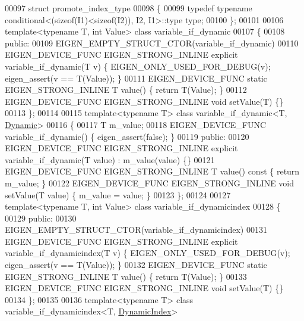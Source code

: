 \begin{DoxyCode}
00097 \textcolor{keyword}{struct }promote\_index\_type
00098 \{
00099   \textcolor{keyword}{typedef} \textcolor{keyword}{typename} conditional<(sizeof(I1)<sizeof(I2)), I2, I1>::type type;
00100 \};
00101 
00106 \textcolor{keyword}{template}<\textcolor{keyword}{typename} T, \textcolor{keywordtype}{int} Value> \textcolor{keyword}{class }variable\_if\_dynamic
00107 \{
00108   \textcolor{keyword}{public}:
00109     EIGEN\_EMPTY\_STRUCT\_CTOR(variable\_if\_dynamic)
00110     EIGEN\_DEVICE\_FUNC EIGEN\_STRONG\_INLINE \textcolor{keyword}{explicit} variable\_if\_dynamic(T v) \{ EIGEN\_ONLY\_USED\_FOR\_DEBUG(v);
       eigen\_assert(v == T(Value)); \}
00111     EIGEN\_DEVICE\_FUNC \textcolor{keyword}{static} EIGEN\_STRONG\_INLINE T value() \{ \textcolor{keywordflow}{return} T(Value); \}
00112     EIGEN\_DEVICE\_FUNC EIGEN\_STRONG\_INLINE \textcolor{keywordtype}{void} setValue(T) \{\}
00113 \};
00114 
00115 \textcolor{keyword}{template}<\textcolor{keyword}{typename} T> \textcolor{keyword}{class }variable\_if\_dynamic<T, \hyperlink{namespace_eigen_ad81fa7195215a0ce30017dfac309f0b2}{Dynamic}>
00116 \{
00117     T m\_value;
00118     EIGEN\_DEVICE\_FUNC variable\_if\_dynamic() \{ eigen\_assert(\textcolor{keyword}{false}); \}
00119   \textcolor{keyword}{public}:
00120     EIGEN\_DEVICE\_FUNC EIGEN\_STRONG\_INLINE \textcolor{keyword}{explicit} variable\_if\_dynamic(T value) : m\_value(value) \{\}
00121     EIGEN\_DEVICE\_FUNC EIGEN\_STRONG\_INLINE T value()\textcolor{keyword}{ const }\{ \textcolor{keywordflow}{return} m\_value; \}
00122     EIGEN\_DEVICE\_FUNC EIGEN\_STRONG\_INLINE \textcolor{keywordtype}{void} setValue(T value) \{ m\_value = value; \}
00123 \};
00124 
00127 \textcolor{keyword}{template}<\textcolor{keyword}{typename} T, \textcolor{keywordtype}{int} Value> \textcolor{keyword}{class }variable\_if\_dynamicindex
00128 \{
00129   \textcolor{keyword}{public}:
00130     EIGEN\_EMPTY\_STRUCT\_CTOR(variable\_if\_dynamicindex)
00131     EIGEN\_DEVICE\_FUNC EIGEN\_STRONG\_INLINE \textcolor{keyword}{explicit} variable\_if\_dynamicindex(T v) \{ 
      EIGEN\_ONLY\_USED\_FOR\_DEBUG(v); eigen\_assert(v == T(Value)); \}
00132     EIGEN\_DEVICE\_FUNC \textcolor{keyword}{static} EIGEN\_STRONG\_INLINE T value() \{ \textcolor{keywordflow}{return} T(Value); \}
00133     EIGEN\_DEVICE\_FUNC EIGEN\_STRONG\_INLINE \textcolor{keywordtype}{void} setValue(T) \{\}
00134 \};
00135 
00136 \textcolor{keyword}{template}<\textcolor{keyword}{typename} T> \textcolor{keyword}{class }variable\_if\_dynamicindex<T, \hyperlink{namespace_eigen_a73c597189a4a99127175e8167c456fff}{DynamicIndex}>

\end{DoxyCode}

